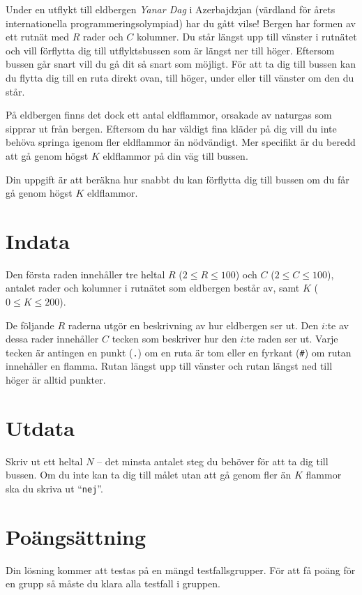 Under en utflykt till eldbergen \emph{Yanar Dag} i Azerbajdzjan (värdland för årets internationella programmeringsolympiad) har du gått vilse!
Bergen har formen av ett rutnät med $R$ rader och $C$ kolumner.
Du står längst upp till vänster i rutnätet och vill förflytta dig till utflyktsbussen som är längst ner till höger.
Eftersom bussen går snart vill du gå dit så snart som möjligt.
För att ta dig till bussen kan du flytta dig till en ruta direkt ovan, till höger, under eller till vänster om den du står.

På eldbergen finns det dock ett antal eldflammor, orsakade av naturgas som sipprar ut från bergen.
Eftersom du har väldigt fina kläder på dig vill du inte behöva springa igenom fler eldflammor än nödvändigt.
Mer specifikt är du beredd att gå genom högst $K$ eldflammor på din väg till bussen.

Din uppgift är att beräkna hur snabbt du kan förflytta dig till bussen om du får gå genom högst $K$ eldflammor.

\section*{Indata}
Den första raden innehåller tre heltal $R$ ($2 \le R \le 100$) och $C$ ($2 \le C \le 100$), antalet rader och kolumner i rutnätet som eldbergen består av, samt $K$ ($0 \le K \le 200$).

De följande $R$ raderna utgör en beskrivning av hur eldbergen ser ut.
Den $i$:te av dessa rader innehåller $C$ tecken som beskriver hur den $i$:te raden ser ut.
Varje tecken är antingen en punkt (\texttt{.}) om en ruta är tom eller en fyrkant (\texttt{\#}) om rutan innehåller en flamma. Rutan längst upp till vänster och rutan längst ned till höger är alltid punkter.

\section*{Utdata}
Skriv ut ett heltal $N$ -- det minsta antalet steg du behöver för att ta dig till bussen.
Om du inte kan ta dig till målet utan att gå genom fler än $K$ flammor ska du skriva ut ``\texttt{nej}''.

\section*{Poängsättning}
Din lösning kommer att testas på en mängd testfallsgrupper.
För att få poäng för en grupp så måste du klara alla testfall i gruppen.


